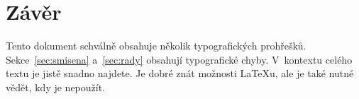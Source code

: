 \documentclass[a4paper, 10pt, twocolumn]{article}
\begin{document}
\section{Závěr}

Tento dokument schválně obsahuje několik typografických prohřešků.
Sekce~\ref{sec:smisena} a~\ref{sec:rady} obsahují typografické chyby.
V~kontextu celého textu je jistě snadno najdete.
Je dobré znát možnosti \LaTeX u, ale je také nutné vědět, kdy je nepoužít.
\end{document}
